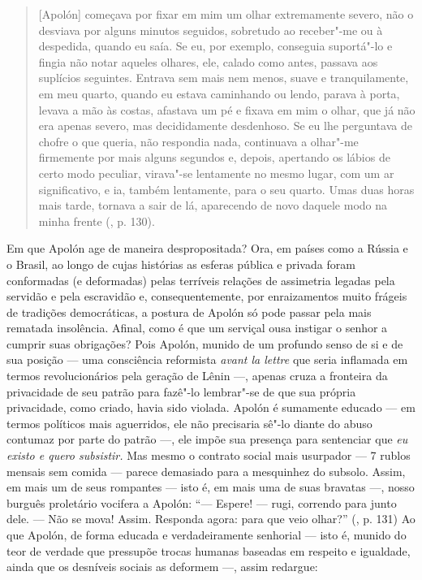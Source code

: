 \begin{quote}
{[}Apolón{]} começava por fixar em mim um olhar extremamente severo, não
o desviava por alguns minutos seguidos, sobretudo ao receber"-me ou à
despedida, quando eu saía. Se eu, por exemplo, conseguia suportá"-lo e
fingia não notar aqueles olhares, ele, calado como antes, passava aos
suplícios seguintes. Entrava sem mais nem menos, suave e tranquilamente,
em meu quarto, quando eu estava caminhando ou lendo, parava à porta,
levava a mão às costas, afastava um pé e fixava em mim o olhar, que já
não era apenas severo, mas decididamente desdenhoso. Se eu lhe
perguntava de chofre o que queria, não respondia nada, continuava a
olhar"-me firmemente por mais alguns segundos e, depois, apertando os
lábios de certo modo peculiar, virava"-se lentamente no mesmo lugar, com
um ar significativo, e ia, também lentamente, para o seu quarto. Umas
duas horas mais tarde, tornava a sair de lá, aparecendo de novo daquele
modo na minha frente (, p. 130).
\end{quote}

Em que Apolón age de maneira despropositada? Ora, em países como a
Rússia e o Brasil, ao longo de cujas histórias as esferas pública e
privada foram conformadas (e deformadas) pelas terríveis relações de
assimetria legadas pela servidão e pela escravidão e, consequentemente,
por enraizamentos muito frágeis de tradições democráticas, a postura de
Apolón só pode passar pela mais rematada insolência. Afinal, como é que
um serviçal ousa instigar o senhor a cumprir suas obrigações? Pois
Apolón, munido de um profundo senso de si e de sua posição --- uma
consciência reformista \emph{avant la lettre} que seria inflamada em
termos revolucionários pela geração de Lênin ---, apenas cruza a
fronteira da privacidade de seu patrão para fazê"-lo lembrar"-se de que
sua própria privacidade, como criado, havia sido violada. Apolón é
sumamente educado --- em termos políticos mais aguerridos, ele não
precisaria sê"-lo diante do abuso contumaz por parte do patrão ---, ele
impõe sua presença para sentenciar que \emph{eu existo e quero
subsistir.} Mas mesmo o contrato social mais usurpador --- 7 rublos
mensais sem comida --- parece demasiado para a mesquinhez do subsolo.
Assim, em mais um de seus rompantes --- isto é, em mais uma de suas
bravatas ---, nosso burguês proletário vocifera a Apolón: ``--- Espere! ---
rugi, correndo para junto dele. --- Não se mova! Assim. Responda agora:
para que veio olhar?'' (, p. 131) Ao que Apolón, de forma educada e
verdadeiramente senhorial --- isto é, munido do teor de verdade que
pressupõe trocas humanas baseadas em respeito e igualdade, ainda que os
desníveis sociais as deformem ---, assim redargue:

